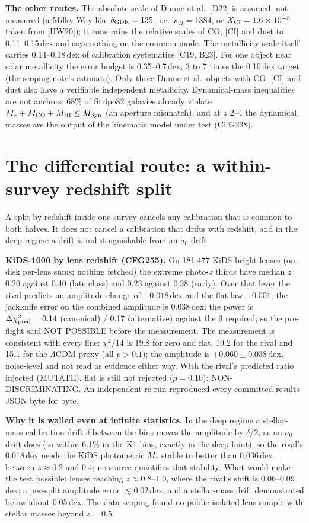 \documentclass[10pt]{article}
\begin{document}
\textbf{The other routes.} The absolute scale of Dunne et al.\ [D22] is assumed, not measured (a Milky-Way-like $\delta_{\rm GDR}=135$, i.e.\ $\kappa_H=1884$, or $X_{\rm CI}=1.6\times10^{-5}$ taken from [HW20]); it constrains the relative scales of CO, [CI] and dust to 0.11--0.15\,dex and says nothing on the common mode. The metallicity scale itself carries 0.14--0.18\,dex of calibration systematics [C19, B23]. For one object near solar metallicity the error budget is 0.35--0.7\,dex, 3 to 7 times the 0.10\,dex target (the scoping note's estimate). Only three Dunne et al.\ objects with CO, [CI] and dust also have a verifiable independent metallicity. Dynamical-mass inequalities are not anchors: 68\% of Stripe82 galaxies already violate $M_*+M_{\rm CO}+M_{\rm HI}\le M_{\rm dyn}$ (an aperture mismatch), and at $z$ 2--4 the dynamical masses are the output of the kinematic model under test (CFG238).

\section{The differential route: a within-survey redshift split}\label{sec:diff}

A split by redshift inside one survey cancels any calibration that is common to both halves. It does not cancel a calibration that drifts with redshift, and in the deep regime a drift is indistinguishable from an $a_0$ drift.

\textbf{KiDS-1000 by lens redshift (CFG255).} On 181,477 KiDS-bright lenses (on-disk per-lens sums; nothing fetched) the extreme photo-$z$ thirds have median $z$ 0.20 against 0.40 (late class) and 0.23 against 0.38 (early). Over that lever the rival predicts an amplitude change of $+0.018$\,dex and the flat law $+0.001$; the jackknife error on the combined amplitude is 0.038\,dex; the power is $\Delta\chi^2_{\rm pred}=0.14$ (canonical) / 0.17 (alternative) against the 9 required, so the pre-flight said NOT POSSIBLE before the measurement. The measurement is consistent with every line: $\chi^2/14$ is 19.8 for zero and flat, 19.2 for the rival and 15.1 for the $\Lambda$CDM proxy (all $p>0.1$); the amplitude is $+0.060\pm0.038$\,dex, noise-level and not read as evidence either way. With the rival's predicted ratio injected (MUTATE), flat is still not rejected ($p=0.10$): NON-DISCRIMINATING. An independent re-run reproduced every committed results JSON byte for byte.

\textbf{Why it is walled even at infinite statistics.} In the deep regime a stellar-mass calibration drift $\delta$ between the bins moves the amplitude by $\delta/2$, as an $a_0$ drift does (to within 6.1\% in the K1 bins, exactly in the deep limit), so the rival's 0.018\,dex needs the KiDS photometric $M_*$ stable to better than 0.036\,dex between $z\approx0.2$ and 0.4; no source quantifies that stability. What would make the test possible: lenses reaching $z\approx0.8$--1.0, where the rival's shift is 0.06--0.09\,dex; a per-split amplitude error $\lesssim0.02$\,dex; and a stellar-mass drift demonstrated below about 0.05\,dex. The data scoping found no public isolated-lens sample with stellar masses beyond $z=0.5$.
\end{document}
